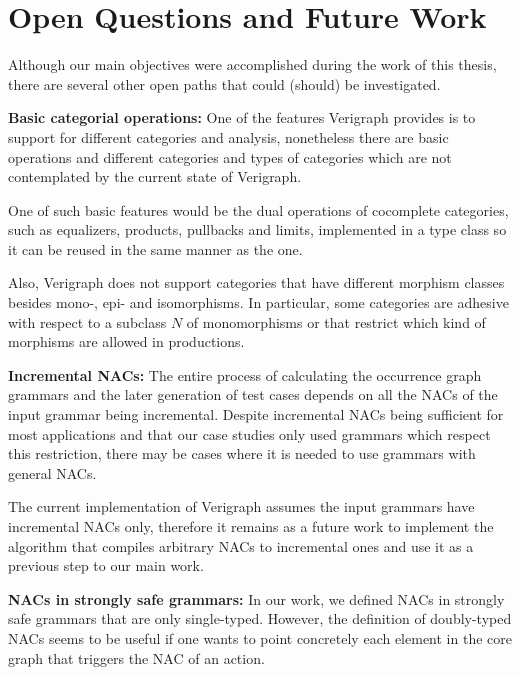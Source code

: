 \section{Open Questions and Future Work}

Although our main objectives were accomplished during the work of this thesis, there are several other open paths that could (should) be investigated. 



\textbf{Basic categorial operations:} One of the features Verigraph provides is to support for different categories and analysis, nonetheless there are basic operations and different categories and types of categories which are not contemplated by the current state of Verigraph.

One of such basic features would be the dual operations of cocomplete categories, such as equalizers, products, pullbacks and limits, implemented in a  type class so it can be reused in the same manner as the  one.

Also, Verigraph does not support categories that have different morphism classes besides mono-, epi- and isomorphisms. In particular, some categories are adhesive with respect to a subclass $N$ of monomorphisms or that restrict which kind of morphisms are allowed in productions.

\textbf{Incremental NACs:} The entire process of calculating the occurrence graph grammars and the later generation of test cases depends on all the NACs of the input grammar being incremental. Despite incremental NACs being sufficient for most applications and that our case studies only used grammars which respect this restriction, there may be cases where it is needed to use grammars with general NACs.

  The current implementation of Verigraph assumes the input grammars have incremental NACs only, therefore it remains as a future work to implement the algorithm that compiles arbitrary NACs to incremental ones and use it as a previous step to our main work.

\textbf{NACs in strongly safe grammars:} In our work, we defined NACs in strongly safe grammars that are only single-typed. However, the definition of doubly-typed NACs seems to be useful if one wants to point concretely each element in the core graph that triggers the NAC of an action.

